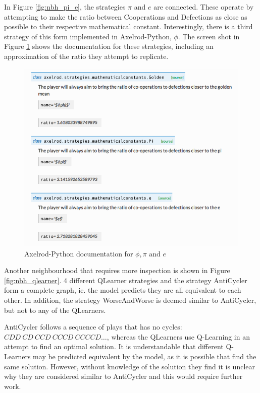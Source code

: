 In Figure \ref{fig:nbh_pi_e}, the strategies $\pi$ and $e$ are connected.
These operate by attempting to make the ratio between Cooperations and Defections as close as possible to their respective mathematical constant.
Interestingly, there is a third strategy of this form implemented in Axelrod-Python, $\phi$.
The screen shot in Figure \ref{fig:ss_pi_phi_e} shows the documentation for these strategies, including an approximation of the ratio they attempt to replicate.

\begin{figure}[htbp!]
    \centering
    \includegraphics[width = 0.8\linewidth]{../img/screenshots/pi_phi_e.png}
    \caption{Axelrod-Python documentation for $\phi, \pi \text{ and } e$}
    \label{fig:ss_pi_phi_e}
\end{figure}

Another neighbourhood that requires more inspection is shown in Figure \ref{fig:nbh_qlearner}.
4 different QLearner strategies and the strategy AntiCycler form a complete graph, ie. the model predicts they are all equivalent to each other.
In addition, the strategy WorseAndWorse is deemed similar to AntiCycler, but not to any of the QLearners.

AntiCycler follows a sequence of plays that has no cycles: $CDD\ CD\ CCD\ CCCD\ CCCCD \dots $, whereas the QLearners use Q-Learning \cite{Watkins1992} in an attempt to find an optimal solution.
It is understandable that different Q-Learners may be predicted equivalent by the model, as it is possible that find the same solution.
However, without knowledge of the solution they find it is unclear why they are considered similar to AntiCycler and this would require further work.



